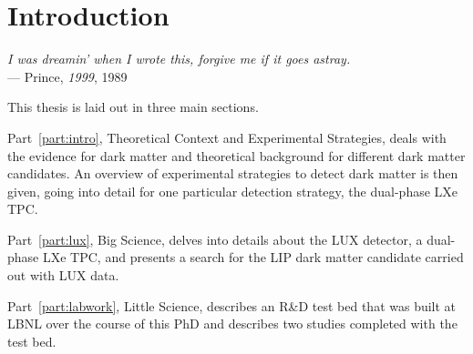 \chapter{Introduction}\label{ch:introduction} %

\begin{flushright}{\slshape    
    I was dreamin' when I wrote this, forgive me if it goes astray. } \\ \medskip
    --- {Prince, \textit{1999}, 1989}
\end{flushright}

This thesis is laid out in three main sections. 

Part~\ref{part:intro}, Theoretical Context and Experimental Strategies, deals with the evidence for dark matter and theoretical background for different dark matter candidates. An overview of experimental strategies to detect dark matter is then given, going into detail for one particular detection strategy, the dual-phase \ac{LXe} \ac{TPC}.

Part~\ref{part:lux}, Big Science, delves into details about the \ac{LUX} detector, a dual-phase \ac{LXe} \ac{TPC}, and presents a search for the \ac{LIP} dark matter candidate carried out with \ac{LUX} data.

Part~\ref{part:labwork}, Little Science, describes an R\&D test bed that was built at \ac{LBNL} over the course of this PhD and describes two studies completed with the test bed. 



